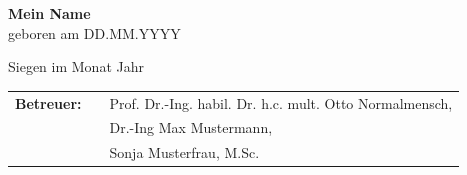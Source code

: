 \begin{titlepage}
\begin{center}
\large{\textbf{Mein Name}} \\
\small{geboren am DD.MM.YYYY}
\end{center}
%
\vspace{.5cm}
%
\begin{center}
\large{Siegen im Monat Jahr}
\end{center}
%
\vspace{3cm}
%
\begin{tabular}{lll}
    \textbf{Betreuer:} & & Prof.  Dr.-Ing. habil. Dr. h.c. mult. Otto Normalmensch, \\
    & & Dr.-Ing Max Mustermann, \\
    & & Sonja Musterfrau, M.Sc. 
\end{tabular}
%
\end{titlepage}
